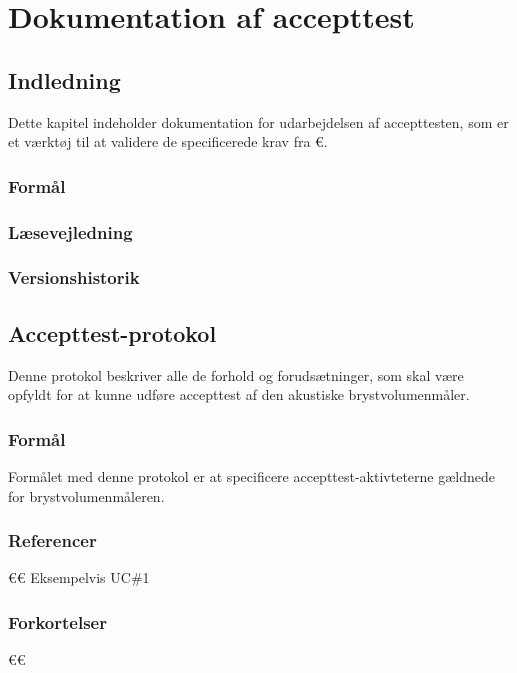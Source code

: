 
\chapter{Dokumentation af accepttest}
	\section{Indledning}
	Dette kapitel indeholder dokumentation for udarbejdelsen af accepttesten, som er et værktøj til at validere de specificerede krav fra €.   
	 		  
		\subsection{Formål}
		
	
		\subsection{Læsevejledning}	
		
				
		\subsection{Versionshistorik}
		
		\vspace{5mm}
		
			\begin{figure}[htb]
				
			\end{figure}
			
			
	\section{Accepttest-protokol}
	Denne protokol beskriver alle de forhold og forudsætninger, som skal være opfyldt for at kunne udføre accepttest af den akustiske brystvolumenmåler. 
	  
		\subsection{Formål}
		Formålet med denne protokol er at specificere accepttest-aktivteterne gældnede for brystvolumenmåleren. 
		
		\subsection{Referencer}
		€€ Eksempelvis UC\#1
		
		\subsection{Forkortelser}
		€€
		  
